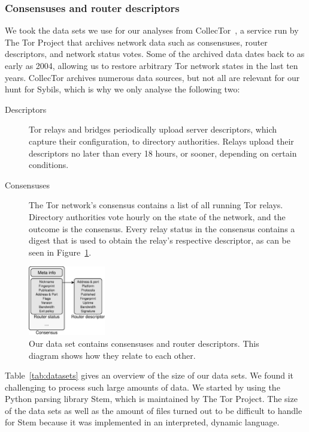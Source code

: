 \subsubsection{Consensuses and router descriptors}
We took the data sets we use for our analyses from CollecTor~\cite{collector},
a service run by The Tor Project that archives network data such as
consensuses, router descriptors, and network status votes.  Some of the
archived data dates back to as early as 2004, allowing us to restore arbitrary
Tor network states in the last ten years.  CollecTor archives numerous data
sources, but not all are relevant for our hunt for Sybils, which is why we only
analyse the following two:

\begin{description}
	\item[Descriptors] Tor relays and bridges periodically upload server
		descriptors, which capture their configuration, to directory
		authorities.  Relays upload their descriptors no later than every 18
		hours, or sooner, depending on certain conditions.

	\item[Consensuses] The Tor network's consensus contains a list of all
		running Tor relays.  Directory authorities vote hourly on the state of
		the network, and the outcome is the consensus.  Every relay status in
		the consensus contains a digest that is used to obtain the relay's
		respective descriptor, as can be seen in Figure~\ref{fig:datasets}.
\end{description}

\begin{figure}[t]
	\centering
	\includegraphics[width=0.3\textwidth]{diagrams/data_sets.pdf}
	\caption{Our data set contains consensuses and router descriptors.  This
		diagram shows how they relate to each other.}
	\label{fig:datasets}
\end{figure}

Table~\ref{tab:datasets} gives an overview of the size of our data sets.  We
found it challenging to process such large amounts of data.  We started by
using the Python parsing library Stem, which is maintained by The Tor Project.
The size of the data sets as well as the amount of files turned out to be
difficult to handle for Stem because it was implemented in an interpreted,
dynamic language.

